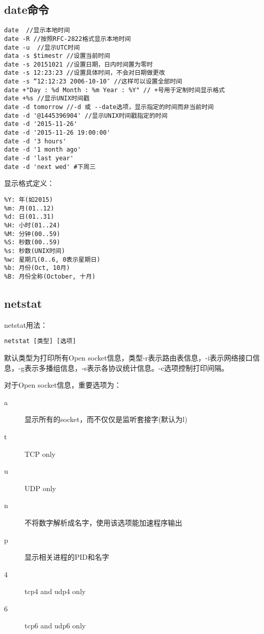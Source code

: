 \subsection{date命令}
\begin{verbatim}
date  //显示本地时间
date -R //按照RFC-2822格式显示本地时间
date -u  //显示UTC时间
data -s $timestr //设置当前时间
date -s 20151021 //设置日期，日内时间置为零时
date -s 12:23:23 //设置具体时间，不会对日期做更改
date -s “12:12:23 2006-10-10″ //这样可以设置全部时间
date +"Day : %d Month : %m Year : %Y" // +号用于定制时间显示格式
date +%s //显示UNIX时间戳
date -d tomorrow //-d 或 --date选项，显示指定的时间而非当前时间
date -d '@1445396904' //显示UNIX时间戳指定的时间
date -d '2015-11-26'
date -d '2015-11-26 19:00:00'
date -d '3 hours'
date -d '1 month ago'
date -d 'last year' 
date -d 'next wed' #下周三
\end{verbatim}


显示格式定义：
\begin{verbatim}
%Y: 年(如2015)
%m: 月(01..12)
%d: 日(01..31)
%H: 小时(01..24)
%M: 分钟(00..59)
%S: 秒数(00..59)
%s: 秒数(UNIX时间)
%w: 星期几(0..6, 0表示星期日)
%b: 月份(Oct, 10月)
%B: 月份全称(October, 十月)

\end{verbatim}

\subsection{netstat}

netstat用法：
\begin{verbatim}
netstat [类型] [选项]
\end{verbatim}
默认类型为打印所有Open socket信息，类型-r表示路由表信息，-i表示网络接口信息，-g表示多播组信息，-s表示各协议统计信息。-c选项控制打印间隔。

对于Open socket信息，重要选项为：
\begin{description}
    \item  [a] 显示所有的socket，而不仅仅是监听套接字(默认为l)
    \item  [t] TCP only
    \item  [u] UDP only
    \item  [n] 不将数字解析成名字，使用该选项能加速程序输出
    \item  [p] 显示相关进程的PID和名字
    \item  [4] tcp4 and udp4 only
    \item  [6] tcp6 and udp6 only
\end{description}

